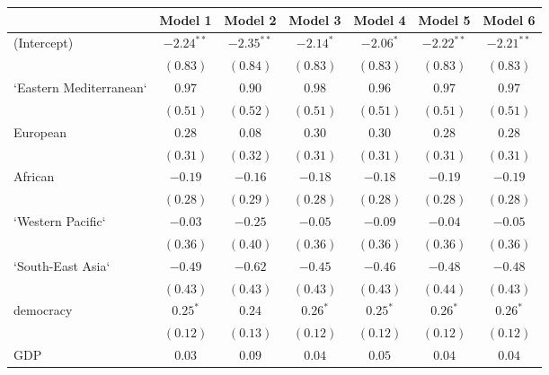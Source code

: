 
\begin{table}[!h]
\begin{center}
\begin{tabular}{l c c c c c c }
\toprule
 & Model 1 & Model 2 & Model 3 & Model 4 & Model 5 & Model 6 \\
\midrule
(Intercept)             & $-2.24^{**}$ & $-2.35^{**}$ & $-2.14^{*}$  & $-2.06^{*}$  & $-2.22^{**}$ & $-2.21^{**}$ \\
                        & $(0.83)$     & $(0.84)$     & $(0.83)$     & $(0.83)$     & $(0.83)$     & $(0.83)$     \\
`Eastern Mediterranean` & $0.97$       & $0.90$       & $0.98$       & $0.96$       & $0.97$       & $0.97$       \\
                        & $(0.51)$     & $(0.52)$     & $(0.51)$     & $(0.51)$     & $(0.51)$     & $(0.51)$     \\
European                & $0.28$       & $0.08$       & $0.30$       & $0.30$       & $0.28$       & $0.28$       \\
                        & $(0.31)$     & $(0.32)$     & $(0.31)$     & $(0.31)$     & $(0.31)$     & $(0.31)$     \\
African                 & $-0.19$      & $-0.16$      & $-0.18$      & $-0.18$      & $-0.19$      & $-0.19$      \\
                        & $(0.28)$     & $(0.29)$     & $(0.28)$     & $(0.28)$     & $(0.28)$     & $(0.28)$     \\
`Western Pacific`       & $-0.03$      & $-0.25$      & $-0.05$      & $-0.09$      & $-0.04$      & $-0.05$      \\
                        & $(0.36)$     & $(0.40)$     & $(0.36)$     & $(0.36)$     & $(0.36)$     & $(0.36)$     \\
`South-East Asia`       & $-0.49$      & $-0.62$      & $-0.45$      & $-0.46$      & $-0.48$      & $-0.48$      \\
                        & $(0.43)$     & $(0.43)$     & $(0.43)$     & $(0.43)$     & $(0.44)$     & $(0.43)$     \\
democracy               & $0.25^{*}$   & $0.24$       & $0.26^{*}$   & $0.25^{*}$   & $0.26^{*}$   & $0.26^{*}$   \\
                        & $(0.12)$     & $(0.13)$     & $(0.12)$     & $(0.12)$     & $(0.12)$     & $(0.12)$     \\
GDP                     & $0.03$       & $0.09$       & $0.04$       & $0.05$       & $0.04$       & $0.04$       \\

\end{tabular}
\end{center}
\end{table}
